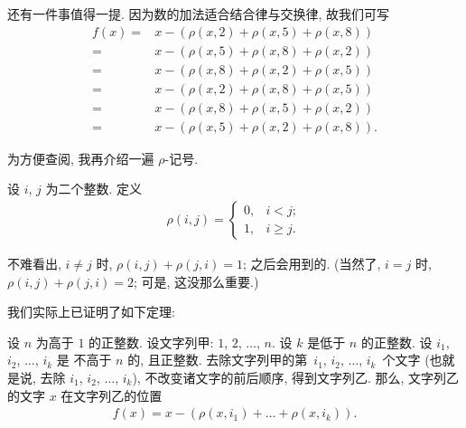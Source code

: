 \documentclass[%
    UTF8,%
    fontset=none,%
    punct=kaiming,%
    zihao=-4,%
    a4paper,%
    oneside,%
]{ctexbook}
\let\emph\relax
\renewcommand*{\geq}{\geqslant}
\begin{document}
\begin{example}
    还有一件事值得一提.
    因为数的加法适合结合律与交换律,
    故我们可写
    \begin{align*}
        f(x)
        = {} & x - (\rho(x, 2) + \rho(x, 5) + \rho(x, 8))  \\
        = {} & x - (\rho(x, 5) + \rho(x, 8) + \rho(x, 2))  \\
        = {} & x - (\rho(x, 8) + \rho(x, 2) + \rho(x, 5))  \\
        = {} & x - (\rho(x, 2) + \rho(x, 8) + \rho(x, 5))  \\
        = {} & x - (\rho(x, 8) + \rho(x, 5) + \rho(x, 2))  \\
        = {} & x - (\rho(x, 5) + \rho(x, 2) + \rho(x, 8)).
    \end{align*}
\end{example}

为方便查阅, 我再介绍一遍 \(\rho\)-记号.

\begin{definition}[\(\rho\)-记号]
    设 \(i\), \(j\) 为二个整数.
    定义
    \begin{align*}
        \rho(i, j)
        = \begin{cases}
              0, & i < j;    \\
              1, & i \geq j.
          \end{cases}
    \end{align*}
\end{definition}

不难看出, \(i \neq j\) 时,
\(\rho(i, j) + \rho(j, i) = 1\);
之后会用到的.
(当然了, \(i = j\) 时, \(\rho(i, j) + \rho(j, i) = 2\);
可是, 这没那么重要.)

\vspace{2ex}

我们实际上已证明了如下定理:

\begin{theorem}[缺项定位]
    设 \(n\) 为高于 \(1\) 的正整数.
    设文字列甲: \(1\), \(2\), \(\dots\), \(n\).
    设 \(k\) 是低于 \(n\) 的正整数.
    设 \(i_1\), \(i_2\), \(\dots\), \(i_k\) 是%
    不高于 \(n\) 的, 且\emph{互不相同的}正整数.
    去除文字列甲的第~\(i_1\), \(i_2\), \(\dots\), \(i_k\)~个文字
    (也就是说, 去除 \(i_1\), \(i_2\), \(\dots\), \(i_k\)),
    不改变诸文字的前后顺序,
    得到文字列乙.
    那么,
    文字列乙的文字 \(x\)
    在文字列乙的位置
    \begin{align*}
        f(x) = x - (\rho(x, i_1) + \dots + \rho(x, i_k)).
    \end{align*}
\end{theorem}
\end{document}
